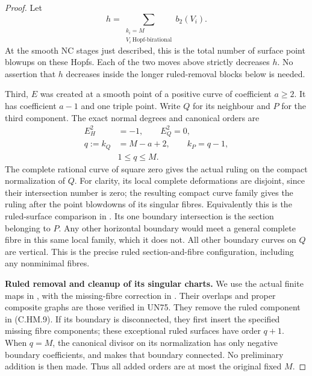 \begin{proof}
Let
\[
       h=\sum_{\substack{k_i=M\\
                     V_i\ \mathrm{Hopf\text{-}birational}}}
                              b_2(V_i).
\tag{C.HM.8}
\]
At the smooth NC stages just described, this is the
total number of surface point blowups on these Hopfs.
Each of the two moves above strictly decreases \(h\).
No assertion that \(h\) decreases inside the longer
ruled-removal blocks below is needed.

Third, \(E\) was created at a smooth point of a
positive curve of coefficient \(a\ge2\).  It has
coefficient \(a-1\) and one triple point.  Write \(Q\)
for its neighbour and \(P\) for the third component.
The exact normal degrees and canonical orders are
\[
 \begin{split}
 E_H^2&=-1,\qquad E_Q^2=0,\\
 q:=k_Q&=M-a+2,\qquad k_P=q-1,\\
                         &1\le q\le M .
 \end{split}
\tag{C.HM.9}
\]
The complete rational curve of square zero gives
the actual ruling on the compact normalization of
\(Q\).  For clarity, its local complete deformations
are disjoint, since their intersection number is zero;
the resulting compact curve family gives the ruling
after the point blowdowns of its singular fibres.
Equivalently this is the ruled-surface comparison in
\cite[\S4.5]{Kulikov1977}.  Its one boundary intersection
is the section belonging to \(P\).  Any other
horizontal boundary would meet a general complete
fibre in this same local family, which it does not.
All other boundary curves on \(Q\) are vertical.
This is the precise ruled section-and-fibre
configuration, including any nonminimal fibres.

\par\medskip\noindent\textbf{Ruled removal and cleanup of its singular charts.}
We use the actual finite maps in
\cite[\S\S4.10.7--4.10.9,4.14]{Kulikov1977}, with
the missing-fibre correction in
\cite[\S8]{Kulikov1981}.  Their overlaps and proper
composite graphs are those verified in UN75.
They remove the ruled component in (C.HM.9).
If its boundary is disconnected, they first insert
the specified missing fibre components; these
exceptional ruled surfaces have order \(q+1\).
When \(q=M\), the canonical divisor on its
normalization has only negative boundary
coefficients, and \cite[Lemma2.19]{Kulikov1977}
makes that boundary connected.  No preliminary
addition is then made.  Thus all added orders are
at most the original fixed \(M\).


\end{proof}

